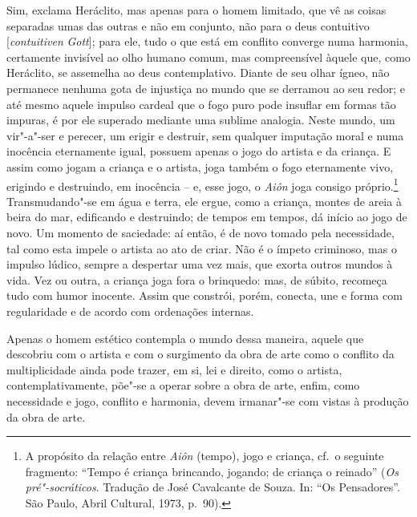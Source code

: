 Sim, exclama Heráclito, mas apenas para o homem limitado, que vê as
coisas separadas umas das outras e não em conjunto, não para o deus
contuitivo [\textit{contuitiven} \textit{Gott}]; para ele, tudo o que
está em conflito converge numa harmonia, certamente invisível ao
olho humano comum, mas compreensível àquele que, como Heráclito, se
assemelha ao deus contemplativo. Diante de seu olhar ígneo, não permanece 
nenhuma gota de injustiça no mundo que se derramou ao seu redor; e até
mesmo aquele impulso cardeal que o fogo puro pode
insuflar em formas tão impuras, é por ele superado mediante uma 
sublime analogia. Neste mundo, um vir"-a"-ser e perecer, um erigir e
destruir, sem qualquer imputação moral e numa inocência eternamente
igual, possuem apenas o jogo do artista e da criança. E assim como jogam 
a criança e o artista, joga também o fogo eternamente
vivo, erigindo e destruindo, em inocência -- e, esse jogo, o
\textit{Aiôn} joga consigo próprio.\footnote{ A propósito da relação
entre \textit{Aiôn} (tempo), jogo e criança, cf.~o seguinte fragmento:
``Tempo é criança brincando, jogando; de criança o reinado'' (\textit{Os
pré"-socráticos}. Tradução de José Cavalcante de Souza. In: ``Os
Pensadores''. São Paulo, Abril Cultural, 1973, p.~90).}
Transmudando"-se em água e terra, ele ergue, como a criança, montes de
areia à beira do mar, edificando e destruindo; de tempos em tempos, dá
início ao jogo de novo. Um momento de saciedade: aí então, é de novo
tomado pela necessidade, tal como esta impele o artista ao ato de
criar. Não é o ímpeto criminoso, mas o impulso lúdico, sempre a
despertar uma vez mais, que exorta outros mundos à vida. Vez ou outra,
a criança joga fora o brinquedo: mas, de súbito, recomeça tudo com
humor inocente. Assim que constrói, porém, conecta, une e forma com
regularidade e de acordo com ordenações internas.

Apenas o homem estético contempla o mundo dessa maneira, aquele que
descobriu com o artista e com o surgimento da obra de arte como o
conflito da multiplicidade ainda pode trazer, em si, lei e direito,
como o artista, contemplativamente, põe"-se a operar sobre a obra de
arte, enfim, como necessidade e jogo, conflito e harmonia, devem
irmanar"-se com vistas à produção da obra de arte.

